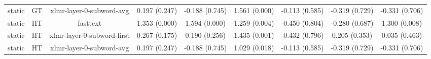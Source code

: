 \begin{sidewaystable}[htb]
\begin{tabular}{@{}ccccccccc@{}}
        static & GT & xlmr-layer-0-subword-avg & 0.197 (0.247) & -0.188 (0.745) & 1.561 (0.000) & -0.113 (0.585) & -0.319 (0.729) & -0.331 (0.706) \\
        static & HT & fasttext & 1.353 (0.000) & 1.594 (0.000) & 1.259 (0.004) & -0.450 (0.804) & -0.280 (0.687) & 1.300 (0.008) \\
        static & HT & xlmr-layer-0-subword-first & 0.267 (0.175) & 0.190 (0.256) & 1.435 (0.001) & -0.432 (0.796) & 0.205 (0.353) & 0.035 (0.463) \\
        static & HT & xlmr-layer-0-subword-avg & 0.197 (0.247) & -0.188 (0.745) & 1.029 (0.018) & -0.113 (0.585) & -0.319 (0.729) & -0.331 (0.706) \\
        \bottomrule
    \end{tabular}
\end{sidewaystable}
